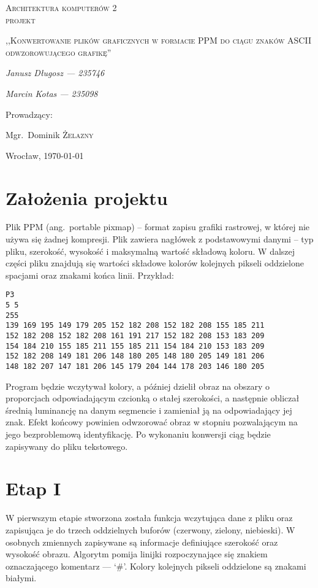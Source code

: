 \documentclass[polish, 11pt]{article}
\begin{document}
\begin{titlepage}
    \centering
    {\scshape\LARGE Architektura komputerów 2\\ projekt \par}
    \vspace{1cm}
    {\scshape\Large,,Konwertowanie plików graficznych w formacie PPM do ciągu znaków ASCII odwzorowującego grafikę''\par}
    \vspace{2cm}
    {\itshape\Large Janusz Długosz --- 235746\/\par}
    {\itshape\Large Marcin Kotas --- 235098\/\par}
    \vfill
    Prowadzący:\par
    Mgr.~Dominik \textsc{Żelazny}

    \vfill

    {\large Wrocław, \today\par}

\end{titlepage}

\section{Założenia projektu}
    Plik PPM (ang.\ portable pixmap) – format zapisu grafiki rastrowej,
    w której nie używa się żadnej kompresji.
    Plik zawiera nagłówek z podstawowymi danymi – typ pliku, szerokość, wysokość i maksymalną wartość składową koloru.
    W dalszej części pliku znajdują się wartości składowe kolorów kolejnych pikseli oddzielone spacjami oraz znakami końca linii.
    Przykład:
    \begin{lstlisting}
P3
5 5
255
139 169 195 149 179 205 152 182 208 152 182 208 155 185 211
152 182 208 152 182 208 161 191 217 152 182 208 153 183 209
154 184 210 155 185 211 155 185 211 154 184 210 153 183 209
152 182 208 149 181 206 148 180 205 148 180 205 149 181 206
148 182 207 147 181 206 145 179 204 144 178 203 146 180 205
\end{lstlisting}

    Program będzie wczytywał kolory, a później dzielił obraz na obszary o proporcjach odpowiadającym czcionką o stałej szerokości,
    a następnie obliczał średnią luminancję na danym segmencie i zamieniał ją na odpowiadający jej znak.
    Efekt końcowy powinien odwzorować obraz w stopniu pozwalającym na jego bezproblemową identyfikację.
    Po wykonaniu konwersji ciąg będzie zapisywany do pliku tekstowego.

\section{Etap I}
    W pierwszym etapie stworzona została funkcja wczytująca dane z pliku oraz zapisująca je do trzech oddzielnych buforów (czerwony, zielony, niebieski).
    W osobnych zmiennych zapisywane są informacje definiujące szerokość oraz wysokość obrazu.
    Algorytm pomija linijki rozpoczynające się znakiem oznaczającego komentarz --- `\#'.
    Kolory kolejnych pikseli oddzielone są znakami białymi.
    
\end{document}
